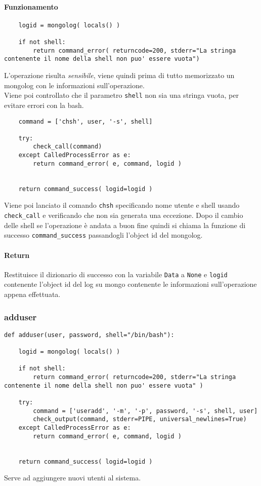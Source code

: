 \documentclass[11pt]{article}
\begin{document}
\paragraph{Funzionamento}
\begin{lstlisting}
    logid = mongolog( locals() )
    
    if not shell:
        return command_error( returncode=200, stderr="La stringa contenente il nome della shell non puo' essere vuota")
\end{lstlisting}
L'operazione risulta \textit{sensibile}, viene quindi prima di tutto memorizzato un mongolog con le informazioni
sull'operazione.\\
Viene poi controllato che il parametro \texttt{shell} non sia una stringa vuota, per evitare errori con la bash.
\begin{lstlisting}
    command = ['chsh', user, '-s', shell]
    
    try:
        check_call(command)
    except CalledProcessError as e:
        return command_error( e, command, logid )

    
    return command_success( logid=logid )
\end{lstlisting}
Viene poi lanciato il comando \texttt{chsh} specificando nome utente e shell usando \texttt{check\_call} e verificando
che non sia generata una eccezione. Dopo il cambio delle shell se l'operazione è andata a buon fine quindi si chiama
la funzione di successo \texttt{command\_success} passandogli l'object id del mongolog.
\paragraph{Return}
Restituisce il dizionario di successo con la variabile \texttt{Data} a \texttt{None} e \texttt{logid} contenente
l'object id del log su mongo contenente le informazioni sull'operazione appena effettuata.

\subsubsection{adduser}\label{adduser}
\begin{lstlisting}
def adduser(user, password, shell="/bin/bash"):
	
    logid = mongolog( locals() )
    
    if not shell:
    	return command_error( returncode=200, stderr="La stringa contenente il nome della shell non puo' essere vuota" )
    
    try:
        command = ['useradd', '-m', '-p', password, '-s', shell, user]
        check_output(command, stderr=PIPE, universal_newlines=True)
    except CalledProcessError as e:
        return command_error( e, command, logid )
    

    return command_success( logid=logid )
\end{lstlisting}
Serve ad aggiungere nuovi utenti al sistema.
\end{document}
